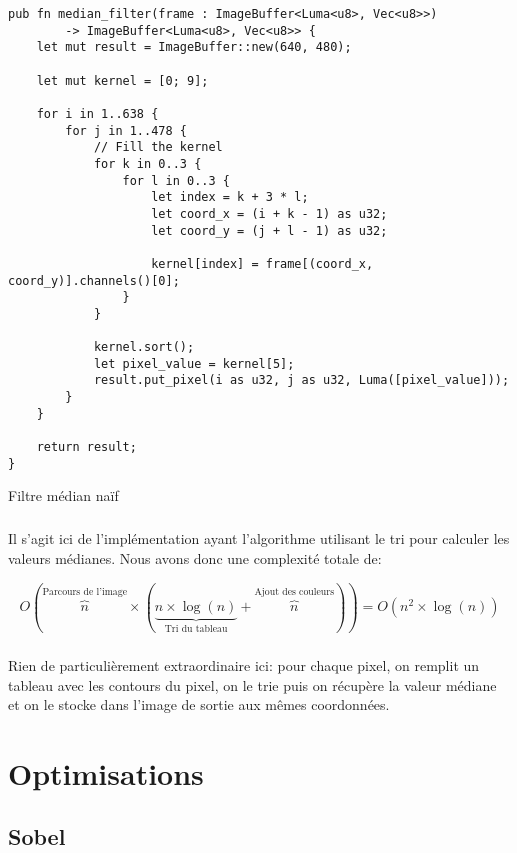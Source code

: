 \documentclass{report}
\begin{document}
\begin{listing}[H]
\begin{verbatim}
pub fn median_filter(frame : ImageBuffer<Luma<u8>, Vec<u8>>)
		-> ImageBuffer<Luma<u8>, Vec<u8>> {
	let mut result = ImageBuffer::new(640, 480);

	let mut kernel = [0; 9];

	for i in 1..638 {
		for j in 1..478 {
			// Fill the kernel
			for k in 0..3 {
				for l in 0..3 {
					let index = k + 3 * l;
					let coord_x = (i + k - 1) as u32;
					let coord_y = (j + l - 1) as u32;

					kernel[index] = frame[(coord_x, coord_y)].channels()[0];
				}
			}

			kernel.sort();
			let pixel_value = kernel[5];
			result.put_pixel(i as u32, j as u32, Luma([pixel_value]));
		}
	}

	return result;
}
\end{verbatim}
\label{lst:naive_median}
\caption{Filtre médian naïf}
\end{listing}

\paragraph{} Il s'agit ici de l'implémentation ayant l'algorithme utilisant le
tri pour calculer les valeurs médianes. Nous avons donc une complexité totale
de:

\[
	O\left(\overbrace{n}^\text{Parcours de l'image} \times
	  \left(\underbrace{n \times \log(n)}_\text{Tri du tableau} +
	  \overbrace{n}^\text{Ajout des couleurs}\right)\right) = O(n^2 \times \log(n))
\]

\paragraph{} Rien de particulièrement extraordinaire ici: pour chaque pixel,
on remplit un tableau avec les contours du pixel, on le trie puis on récupère
la valeur médiane et on le stocke dans l'image de sortie aux mêmes coordonnées.

\chapter{Optimisations}

\section{Sobel}
\end{document}
